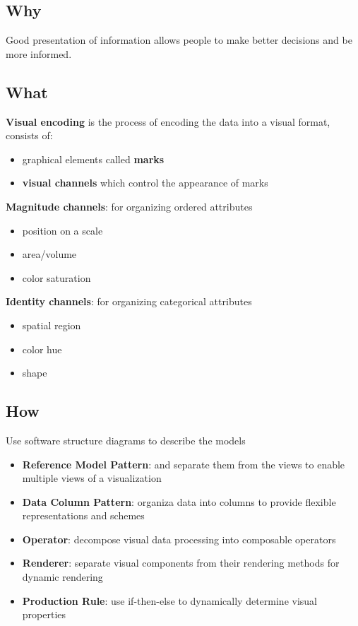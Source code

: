\documentclass[]{article}
\theoremstyle{definition}
\begin{document}
	\subsection{Why}
	Good presentation of information allows people to make better decisions and be more informed.

	\subsection{What}
	\textbf{Visual encoding} is the process of encoding the data into a visual format, consists of:
	\begin{itemize}
		\item graphical elements called \textbf{marks}
		\item \textbf{visual channels} which control the appearance of marks
	\end{itemize}

	\textbf{Magnitude channels}: for organizing ordered attributes
	\begin{itemize}
		\item position on a scale
		\item area/volume
		\item color saturation
	\end{itemize}
	\textbf{Identity channels}: for organizing categorical attributes
	\begin{itemize}
		\item spatial region
		\item color hue
		\item shape
	\end{itemize}

	\subsection{How}
	Use software structure diagrams to describe the models
	\begin{itemize}
		\item \textbf{Reference Model Pattern}: and separate them from the views to enable multiple views of a visualization
		\item \textbf{Data Column Pattern}: organiza data into columns to provide flexible representations and schemes
		\item \textbf{Operator}: decompose visual data processing into composable operators
		\item \textbf{Renderer}: separate visual components from their rendering methods for dynamic rendering
		\item \textbf{Production Rule}: use if-then-else to dynamically determine visual properties
	\end{itemize}
\end{document}
